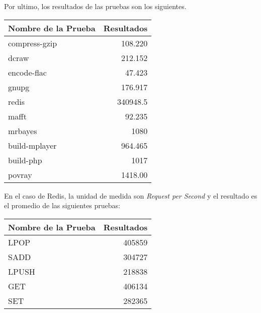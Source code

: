 \documentclass[12pt]{article}
\begin{document}
Por ultimo, los resultados de las pruebas son los siguientes.
\begin{center}
  \begin{tabular}{|l|r|}
    \hline
    \textbf{Nombre de la Prueba} & \textbf{Resultados} \\
    \hline
    compress-gzip                & 108.220 \\
    dcraw                        & 212.152 \\
    encode-flac                  & 47.423 \\
    gnupg                        & 176.917 \\
    redis                        & 340948.5 \\
    mafft                        & 92.235 \\
    mrbayes                      & 1080 \\
    build-mplayer                & 964.465 \\
    build-php                    & 1017 \\
    povray                       & 1418.00 \\
    \hline
  \end{tabular}
\end{center}
En el caso de Redis, la unidad de medida son \textit{Request per Second} y el
resultado es el promedio de las siguientes pruebas:
\begin{center}
  \begin{tabular}{|l|r|}
    \hline
    \textbf{Nombre de la Prueba} & \textbf{Resultados} \\
    \hline
    LPOP                         & 405859 \\
    SADD                         & 304727 \\
    LPUSH                        & 218838 \\
    GET                          & 406134 \\
    SET                          & 282365 \\
    \hline
  \end{tabular}
\end{center}
\end{document}
